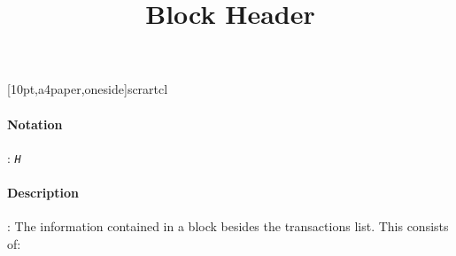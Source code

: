 [10pt,a4paper,oneside]{scrartcl}
\usepackage[latin1]{inputenc}
\usepackage{amsmath}
\usepackage{amsfonts}
\usepackage{amssymb}
\usepackage{makeidx}
\usepackage{graphicx}
\usepackage{booktabs}
\usepackage[
	authordate,
	strict,
	backend=biber
]
{biblatex-chicago}
\usepackage{mathtools}
\author{}
\title{Block Header}
\date{}


\maketitle
\paragraph{Notation}: \textit{\texttt{H}} 
\paragraph{Description}: The information contained in a block besides the transactions list. This consists of: 



